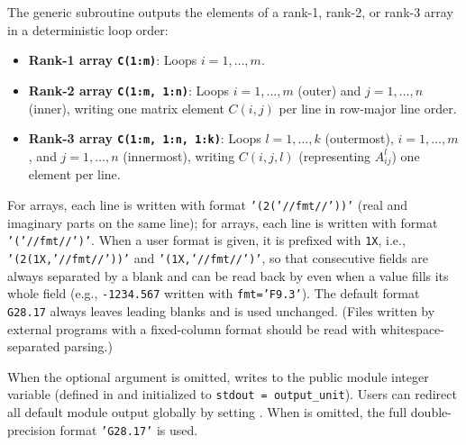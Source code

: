 The generic subroutine  outputs the elements of a rank-1, rank-2, or rank-3 array  in a deterministic loop order:
\begin{itemize}
  \item \textbf{Rank-1 array \texttt{C(1:m)}}: Loops $i = 1, \ldots, m$.
  \item \textbf{Rank-2 array \texttt{C(1:m, 1:n)}}: Loops $i = 1, \ldots, m$ (outer) and $j = 1, \ldots, n$ (inner), writing one matrix element $C(i,j)$ per line in row-major line order.
  \item \textbf{Rank-3 array \texttt{C(1:m, 1:n, 1:k)}}: Loops $l = 1, \ldots, k$ (outermost), $i = 1, \ldots, m$, and $j = 1, \ldots, n$ (innermost), writing $C(i,j,l)$ (representing $A^l_{ij}$) one element per line.
\end{itemize}
For  arrays, each line is written with format \texttt{'(2('//fmt//'))'} (real and imaginary parts on the same line); for  arrays, each line is written with format \texttt{'('//fmt//')'}. When a user format  is given, it is prefixed with \texttt{1X}, i.e., \texttt{'(2(1X,'//fmt//'))'} and \texttt{'(1X,'//fmt//')'}, so that consecutive fields are always separated by a blank and can be read back by  even when a value fills its whole field (e.g., \texttt{-1234.567} written with \texttt{fmt='F9.3'}). The default format \texttt{G28.17} always leaves leading blanks and is used unchanged. (Files written by external programs with a fixed-column format should be read with whitespace-separated parsing.)

When the optional argument  is omitted,  writes to the public module integer variable  (defined in  and initialized to \texttt{stdout = output\_unit}). Users can redirect all default module output globally by setting . When  is omitted, the full double-precision format \texttt{'G28.17'} is used.

\begin{description}[leftmargin=2.2cm, style=nextline]
\end{description}

